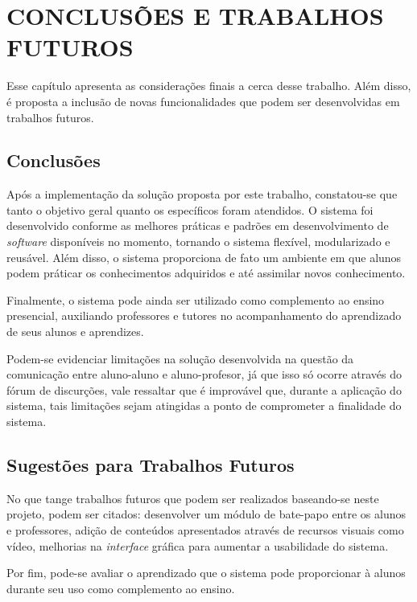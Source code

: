 \chapter{CONCLUSÕES E TRABALHOS FUTUROS}
\label{chap:conclusoes-e-trabalhos-futuros}

Esse capítulo apresenta as considerações finais a cerca desse trabalho. Além disso, é proposta a inclusão de novas funcionalidades que podem ser desenvolvidas em trabalhos futuros.

\section{Conclusões}

Após a implementação da solução proposta por este trabalho, constatou-se que tanto o objetivo geral quanto os específicos foram atendidos. O sistema foi desenvolvido conforme as melhores práticas e padrões em desenvolvimento de \textit{software} disponíveis no momento, tornando o sistema flexível, modularizado e reusável. Além disso, o sistema proporciona de fato um ambiente em que alunos podem práticar os conhecimentos adquiridos e até assimilar novos conhecimento. 

Finalmente, o sistema pode ainda ser utilizado como complemento ao ensino presencial, auxiliando professores e tutores no acompanhamento do aprendizado de seus alunos e aprendizes.

Podem-se evidenciar limitações na solução desenvolvida na questão da comunicação entre aluno-aluno e aluno-profesor, já que isso só ocorre através do fórum de discurções, vale ressaltar que é improvável que, durante a aplicação do sistema, tais limitações sejam atingidas a ponto de comprometer a finalidade do sistema.

\section{Sugestões para Trabalhos Futuros}

No que tange trabalhos futuros que podem ser realizados baseando-se neste projeto, podem ser citados: desenvolver um módulo de bate-papo entre os alunos e professores, adição de conteúdos apresentados através de recursos visuais como vídeo, melhorias na \textit{interface} gráfica para aumentar a usabilidade do sistema. 

Por fim, pode-se avaliar o aprendizado que o sistema pode proporcionar à alunos durante seu uso como complemento ao ensino.



